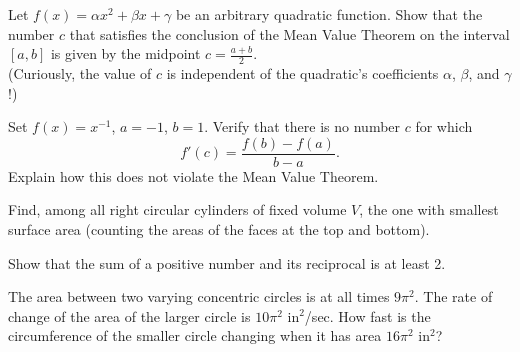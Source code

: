 \documentclass[12pt,letterpaper]{hmcpset}
\begin{document}

\begin{problem}[1]
  Let $f(x) = \alpha x^2+\beta x + \gamma$ be an arbitrary quadratic function. Show that the number $c$ that satisfies the conclusion of the Mean Value Theorem on the interval $[a, b]$ is given by the midpoint $c = \frac{a+b}{2}$. \\

  (Curiously, the value of $c$ is independent of the quadratic's coefficients $\alpha$, $\beta$, and $\gamma$!)
\end{problem}

\begin{solution}
\end{solution}
\pagebreak
\begin{problem}[2]
  Set $f(x) = x^{-1}$, $a = -1$, $b = 1$. Verify that there is no number $c$ for which
  \[ f'(c) = \frac{f(b) - f(a)}{b - a}. \]
  Explain how this does not violate the Mean Value Theorem.
\end{problem}
\begin{solution}

\end{solution}
\pagebreak
\begin{problem}[3]
Find, among all right circular cylinders of fixed volume $V$, the one with smallest surface area (counting the areas of the faces at the top and bottom).
\end{problem}
\begin{solution}

\end{solution}
\pagebreak
\begin{problem}[4]
  Show that the sum of a positive number and its reciprocal is at least 2.
\end{problem}
\begin{solution}

\end{solution}
\pagebreak
\begin{problem}[5]
  The area between two varying concentric circles is at all times $9\pi^2$.
  The rate of change of the area of the larger circle is $10\pi^2 \text{ in}^2$/sec.
  How fast is the circumference of the smaller circle changing when it has area $16\pi^2 \text{ in}^2$?
\end{problem}
\begin{solution}

\end{solution}
\pagebreak
\end{document}
